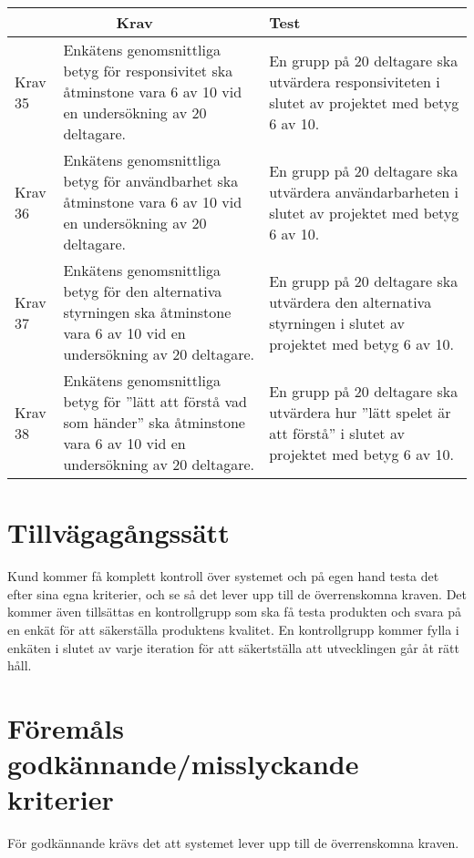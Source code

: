 	\begin{tabular}{| p{1.5cm} | p{6cm} | p{8cm}|}
	
  \hline
    \multicolumn{2}{|c|}{Krav}&{Test}\\
    \hline


		Krav 35& Enkätens\cite {bib-kvalitetsplan} genomsnittliga betyg för responsivitet ska åtminstone vara 6 av 10 vid en undersökning av 20 deltagare. & En grupp på 20 deltagare ska utvärdera responsiviteten i slutet av projektet med betyg 6 av 10. \\
		\hline
		Krav 36& Enkätens\cite {bib-kvalitetsplan} genomsnittliga betyg för användbarhet ska åtminstone vara 6 av 10 vid en undersökning av 20 deltagare. & En grupp på 20 deltagare ska utvärdera användarbarheten i slutet av projektet med betyg 6 av 10. \\
		\hline
		Krav 37& Enkätens\cite {bib-kvalitetsplan} genomsnittliga betyg för den alternativa styrningen ska åtminstone vara 6 av 10 vid en undersökning av 20 deltagare. & En grupp på 20 deltagare ska utvärdera den alternativa styrningen i slutet av projektet med betyg 6 av 10. \\
		\hline
		Krav 38&Enkätens\cite{bib-kvalitetsplan} genomsnittliga betyg för ''lätt att förstå vad som händer'' ska åtminstone vara 6 av 10 vid en undersökning av 20 deltagare. & En grupp på 20 deltagare ska utvärdera hur ''lätt spelet är att förstå'' i slutet av projektet med betyg 6 av 10. \\
		\hline

   
  \end{tabular}
  


\section{Tillvägagångssätt}
	Kund kommer få komplett kontroll över systemet och på egen hand testa det efter sina egna kriterier, och se så det lever upp till de överrenskomna kraven. Det kommer även tillsättas en kontrollgrupp som ska få testa produkten och svara på en enkät för att säkerställa produktens kvalitet. En kontrollgrupp kommer fylla i enkäten i slutet av varje iteration för att säkertställa att utvecklingen går åt rätt håll.
	
	

\section{Föremåls godkännande/misslyckande kriterier}
	För godkännande krävs det att systemet lever upp till de överrenskomna kraven.



